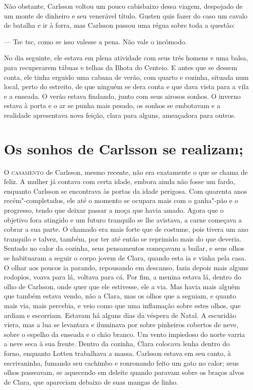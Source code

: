 Não obstante, Carlsson voltou um pouco cabisbaixo dessa viagem, despojado de um
monte de dinheiro e seu venerável título. Gusten quis fazer do caso um cavalo de
batalha e ir à forra, mas Carlsson passou uma régua sobre toda a questão:

--- Tsc tsc, como se isso valesse a pena. Não vale o incômodo.

No dia seguinte, ele estava em plena atividade com seus três homens e uma balsa,
para recuperarem tábuas e telhas da Ilhota do Centeio. E antes que se dessem
conta, ele tinha erguido uma cabana de verão, com quarto e cozinha, situada num
local, perto do estreito, de que ninguém se dera conta e que dava vista
para a vila e a enseada. O verão estava findando, junto com seus airosos sonhos.
O inverno estava à porta e o ar se punha mais pesado, os sonhos se embotavam 
e a realidade apresentava nova feição, clara para alguns, ameaçadora para outros.

\chapter[Os sonhos de Carlsson se realizam\ldots]{Os sonhos de Carlsson se realizam; }

\textsc{O casamento} de Carlsson, mesmo recente, não era exatamente o que
se chama de feliz. A mulher já contava com certa idade, embora ainda não fosse
um fardo, enquanto Carlsson se encontrava às portas da idade perigosa. 
Com quarenta anos recém"-completados, ele até o momento se ocupara mais com o ganha"-pão e o
progresso, tendo que deixar passar a moça que havia amado. Agora que o objetivo
fora atingido e um futuro tranquilo se lhe avistava, a carne começava a cobrar a
sua parte. O chamado era mais forte que de costume, pois tivera um ano tranquilo
e talvez, também, por ter até então se reprimido mais do que deveria.
Sentado no calor da cozinha, seus pensamentos começavam a bailar, e seus olhos
se habituaram a seguir o corpo jovem de Clara, quando esta ia e vinha pela casa.
O olhar aos poucos ia parando, repousando em descanso, fazia depois mais alguns
rodopios, voava para lá, voltava para cá. Por fim, a menina estava lá, dentro do
olho de Carlsson, onde quer que ele estivesse, ele a via. Mas havia mais alguém que também
estava vendo, não a Clara, mas os olhos que a seguiam, e quanto mais via, mais
percebia, e veio como que uma inflamação sobre estes olhos, que ardiam e
escorriam. Estavam há alguns dias da véspera de Natal. A escuridão viera, mas a
lua se levantara e iluminava por sobre pinheiros cobertos de neve, sobre o
espelho da enseada e o chão branco. Um vento impiedoso do norte varria a neve
seca à sua frente. Dentro da cozinha, Clara colocava lenha dentro do forno,
enquanto Lotten trabalhava a massa. Carlsson estava em seu canto, à
escrivaninha, fumando seu cachimbo e ronronando feito um gato no calor; seus
olhos passeavam, se aquecendo em deleite quando paravam sobre os braços alvos de
Clara, que apareciam debaixo de suas mangas de linho.

